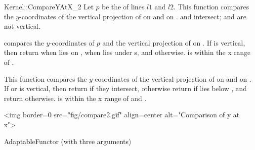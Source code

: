 \begin{ccRefFunctionObjectConcept}{Kernel::CompareYAtX_2}
{Let $p$ be the  of lines $l1$ and $l2$. This function 
 compares the $y$-coordinates of the vertical projection of  on 
  and on %
 .
 \ccPrecond {} and  intersect;  and
  are not vertical.
}

{compares the $y$-coordinates of $p$ and the vertical projection
 of  on .  If  is vertical, then return
  when  lies on ,  when  lies
 under {s}, and  otherwise.
 \ccPrecond {} is within the x range of .}

{This function compares the $y$-coordinates of the vertical projection 
 of  on  and on .  If  or 
 is vertical, then return  if they intersect, otherwise return
  if  lies below , and return 
 otherwise.
 \ccPrecond {} is within the x range of  and .}

\begin{ccHtmlOnly}
<img border=0 src="fig/compare2.gif" align=center alt="Comparison of y at x">
\end{ccHtmlOnly} 

\ccRefines
AdaptableFunctor (with three arguments)

\ccSeeAlso
{}\\

\end{ccRefFunctionObjectConcept}
